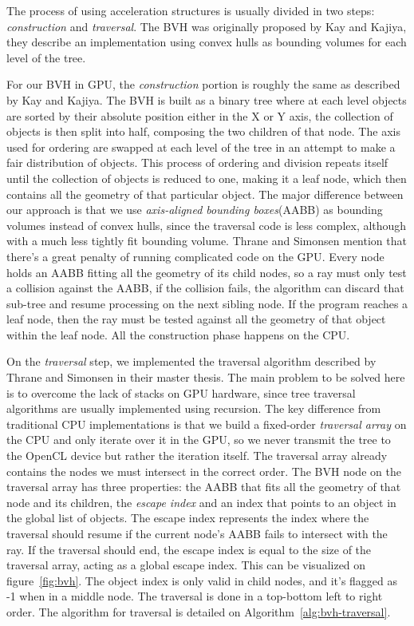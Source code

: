 \documentclass{vgtc}
\begin{document}
The process of using acceleration structures is usually divided in two
steps: \emph{construction} and \emph{traversal}. The BVH was
originally proposed by Kay and Kajiya\cite{kay1986ray}, they describe
an implementation using convex hulls as bounding volumes for each level
of the tree.

For our BVH in GPU, the \emph{construction} portion is roughly the
same as described by Kay and Kajiya. The BVH is built as a binary tree
where at each level objects are sorted by their absolute position
either in the X or Y axis, the collection of objects is then split into
half, composing the two children of that node. The axis used for
ordering are swapped at each level of the tree in an attempt to make a
fair distribution of objects. This process of ordering and division
repeats itself until the collection of objects is reduced to one, making it a
leaf node, which then contains all the geometry of that particular
object. The major difference between our approach is that we use
\emph{axis-aligned bounding boxes}(AABB) as bounding volumes instead of
convex hulls, since the traversal code is less complex, although with
a much less tightly fit bounding volume. Thrane and Simonsen mention
that there's a great penalty of running complicated code on the
GPU\cite{Thrane}. Every node holds an AABB fitting all the geometry of
its child nodes, so a ray must only test a collision against the AABB,
if the collision fails, the algorithm can discard that sub-tree and
resume processing on the next sibling node. If the program reaches a
leaf node, then the ray must be tested against all the geometry of
that object within the leaf node. All the construction phase happens
on the CPU.

On the \emph{traversal} step, we implemented the traversal algorithm
described by Thrane and Simonsen in their master
thesis\cite{Thrane}. The main problem to be solved here is to overcome
the lack of stacks on GPU hardware, since tree traversal algorithms are
usually implemented using recursion. The key difference from
traditional CPU implementations is that we build a fixed-order
\emph{traversal array} on the CPU and only iterate over it in the GPU,
so we never transmit the tree to the OpenCL device but rather the
iteration itself. The traversal array already contains the nodes we
must intersect in the correct order. The BVH node on the traversal
array has three properties: the AABB that fits all the geometry of
that node and its children, the \emph{escape index} and an index that
points to an object in the global list of objects. The escape index
represents the index where the traversal should resume if the current
node's AABB fails to intersect with the ray. If the traversal should
end, the escape index is equal to the size of the traversal array,
acting as a global escape index. This can be visualized on
figure~\ref{fig:bvh}. The object index is only valid in child nodes,
and it's flagged as -1 when in a middle node. The traversal is done in
a top-bottom left to right order. The algorithm for traversal is
detailed on Algorithm~\ref{alg:bvh-traversal}.
\end{document}

